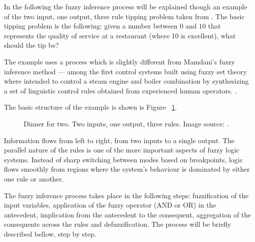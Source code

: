 In the following the fuzzy inference process will be explained though an example of the two input, one output, three rule tipping problem taken from \cite{website:fuzzyinference}. The basic tipping problem is the following: given a number between $0$ and $10$ that represents the quality of service at a restaurant (where 10 is excellent), what should the tip be?

The example uses a process which is slightly different from Mamdani's fuzzy inference method \cite{Mamdani75AnExperiment} --- among the first control systems built using fuzzy set theory where intended to control a steam engine and boiler combination by synthesizing a set of linguistic control rules obtained from experienced human operators. \cite{website:fuzzyinference}. 

The basic structure of the example is shown is Figure ~\ref{fig:tipping}.
\begin{figure}[h!]
\centerline{}
      \caption[Example --- tipping problem.]{Dinner for two. Two inputs, one output, three rules. Image source: \cite{website:fuzzyinference}.}
\label{fig:tipping}
\end{figure}


Information flows from left to right, from two inputs to a single output. The parallel nature of the rules is one of the more important aspects of fuzzy logic systems. Instead of sharp switching between modes based on breakpoints, logic flows smoothly from regions where the system's behaviour is dominated by either one rule or another.

The fuzzy inference process takes place in the following steps: fuzzification of the input variables, application of the fuzzy operator (AND or OR) in the antecedent, implication from the antecedent to the consequent, aggregation of the consequents across the rules and defuzzification. The process will be briefly described bellow, step by step.

